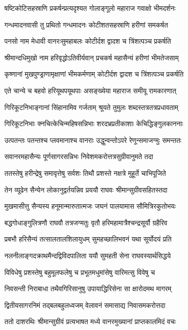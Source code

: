 \twolineshloka
{षष्टिकोटिसहस्राणि प्रकर्षन्प्रत्यदृश्यत}
{गोलाङ्गूलो महाराज गवाक्षो भीमदर्शनः}


\twolineshloka
{गन्धमादनवासी तु प्रथितो गन्धमादनः}
{कोटीशतसहस्राणि हरीणां समकर्षत}


\twolineshloka
{पनसो नाम मेधावी वानरःसुमहाबलः}
{कोटीर्दश द्वादश च त्रिंशत्पञ्च प्रकर्षति}


\twolineshloka
{श्रीमान्दधिमुखो नाम हरिवृद्धोऽतिवीर्यवान्}
{प्रचकर्ष महासैन्यं हरीणां भीमतेजसाम्}


\twolineshloka
{कृष्णानां मुखपुण्ड्राणामृक्षाणां भीमकर्मणाम्}
{कोटीर्दश द्वादश च त्रिंशत्पञ्च प्रकर्षति}


\twolineshloka
{एते चान्ये च बहवो हरियूथपयूथपाः}
{असङ्ख्येया महाराज समीयू रामकारणात्}


\twolineshloka
{गिरिकूटनिभाङ्गानां सिंहानामिव गर्जताम्}
{श्रूयते तुमुलः शब्दस्तत्रतत्रप्रधावताम्}


\twolineshloka
{गिरिकूटनिभाः क्नचित्केचिन्महिषसन्निभाः}
{शरदभ्रप्रतीकाशाः केचिद्धिङ्गुलकाननाः}


\twolineshloka
{उत्पतन्तः पतन्तश्च प्लवमानाश्च वानराः}
{उद्धुन्वन्तोऽपरे रेणून्समाजग्मुः समन्ततः}


\twolineshloka
{सवानरमहासैन्यः पूर्णसागरसन्निभः}
{निवेशमकरोत्तत्रसुग्रीवानुमते तदा}


\twolineshloka
{ततस्तेषु हरीन्द्रेषु समावृत्तेषु सर्वशः}
{तिथौ प्रशस्ते नक्षत्रे मुहूर्ते चाभिपूजिते}


\twolineshloka
{तेन व्यूढेन सैन्येन लोकानुद्वर्तयन्निव}
{प्रययौ राघवः श्रीमान्सुग्रीवसहितस्तदा}


\twolineshloka
{मुखमासीत्तु सैन्यस्य हनूमान्मारुतात्मजः}
{जघनं पालयामास सौमित्रिरकुतोभयः}


\twolineshloka
{बद्धगोधाङ्गुलित्रणौ राघवौ तत्रजग्मतुः}
{वृतौ हरिमहामात्रैश्चन्द्रसूर्यौ ग्रहैरिव}


\twolineshloka
{प्रबभौ हरिसैन्यं तत्सालतालशिलायुधम्}
{सुमहच्छालिभवनं यथा सूर्योदयं प्रति}


\twolineshloka
{नलनीलाङ्गदक्राथमैन्दद्विविदपालिता}
{ययौ सुमहती सेना राघवस्यार्थसिद्धये}


\twolineshloka
{विविधेषु प्रशस्तेषु बहुमूलफलेषु च}
{प्रभूतमधुमांसेषु वारिमत्सु विवेषु च}


\twolineshloka
{निवसन्ती निराबाधा तथैवगिरिसानुषु}
{उपायाद्धिरिसेना सा क्षारोदमथ मागरम्}


\twolineshloka
{द्वितीयसागरनिमं तद्बलबहुलध्वजम्}
{वेलावनं समासाद्य निवासमकरोत्तदा}


\twolineshloka
{ततो दाशरथिः श्रीमान्सुग्रीवं प्रत्यभाषत}
{मध्ये वानरमुख्यानां प्राप्तकालमिदं वचः}


